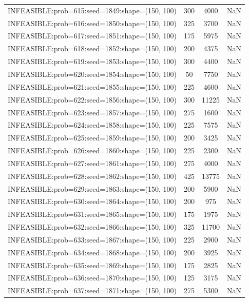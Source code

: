 \begin{longtable}{lccc}
INFEASIBLE:prob=615:seed=1849:shape=(150, 100) &      300 &  4000 &    NaN \\
INFEASIBLE:prob=616:seed=1850:shape=(150, 100) &      325 &  3700 &    NaN \\
INFEASIBLE:prob=617:seed=1851:shape=(150, 100) &      175 &  5975 &    NaN \\
INFEASIBLE:prob=618:seed=1852:shape=(150, 100) &      200 &  4375 &    NaN \\
INFEASIBLE:prob=619:seed=1853:shape=(150, 100) &      300 &  4400 &    NaN \\
INFEASIBLE:prob=620:seed=1854:shape=(150, 100) &       50 &  7750 &    NaN \\
INFEASIBLE:prob=621:seed=1855:shape=(150, 100) &      225 &  4600 &    NaN \\
INFEASIBLE:prob=622:seed=1856:shape=(150, 100) &      300 & 11225 &    NaN \\
INFEASIBLE:prob=623:seed=1857:shape=(150, 100) &      275 &  1600 &    NaN \\
INFEASIBLE:prob=624:seed=1858:shape=(150, 100) &      225 &  7575 &    NaN \\
INFEASIBLE:prob=625:seed=1859:shape=(150, 100) &      200 &  3425 &    NaN \\
INFEASIBLE:prob=626:seed=1860:shape=(150, 100) &      225 &  2300 &    NaN \\
INFEASIBLE:prob=627:seed=1861:shape=(150, 100) &      275 &  4000 &    NaN \\
INFEASIBLE:prob=628:seed=1862:shape=(150, 100) &      425 & 13775 &    NaN \\
INFEASIBLE:prob=629:seed=1863:shape=(150, 100) &      200 &  5900 &    NaN \\
INFEASIBLE:prob=630:seed=1864:shape=(150, 100) &      200 &   975 &    NaN \\
INFEASIBLE:prob=631:seed=1865:shape=(150, 100) &      175 &  1975 &    NaN \\
INFEASIBLE:prob=632:seed=1866:shape=(150, 100) &      325 & 11700 &    NaN \\
INFEASIBLE:prob=633:seed=1867:shape=(150, 100) &      225 &  2900 &    NaN \\
INFEASIBLE:prob=634:seed=1868:shape=(150, 100) &      200 &  3925 &    NaN \\
INFEASIBLE:prob=635:seed=1869:shape=(150, 100) &      175 &  2825 &    NaN \\
INFEASIBLE:prob=636:seed=1870:shape=(150, 100) &      125 &  3175 &    NaN \\
INFEASIBLE:prob=637:seed=1871:shape=(150, 100) &      275 &  5300 &    NaN \\

\end{longtable}
